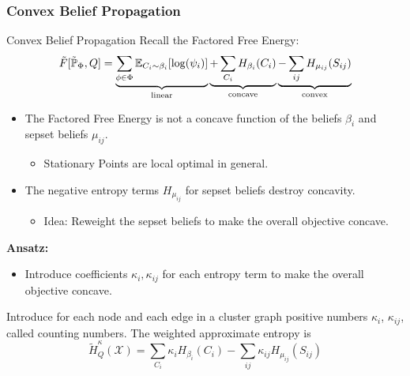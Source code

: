 

\subsubsection{Convex Belief Propagation}

\begin{frame}{Convex Belief Propagation}
Recall the Factored Free Energy:
\begin{equation}
        \tilde{F}[\tilde{\Pb}_{\Phi},Q] = \underbrace{\sum_{\phi \in \Phi} \E_{C_i \sim \beta_i}[\log(\psi_i)]}_{\text{linear}} \underbrace{+ \sum_{C_i} H_{\beta_i}(C_i)}_{\text{concave}} \underbrace{- \sum_{ij} H_{\mu_{ij}}(S_{ij})}_{\text{convex}}
\end{equation}
\begin{itemize}
\pause \item The Factored Free Energy is not a concave function of the beliefs $\beta_i$ and sepset beliefs $\mu_{ij}$.
\begin{itemize}
    \pause \item Stationary Points are local optimal in general.
\end{itemize}
\pause \item The negative entropy terms $H_{\mu_{ij}}$ for sepset beliefs destroy concavity.
\begin{itemize}
    \pause \item Idea: Reweight the sepset beliefs to make the overall objective concave.
\end{itemize}
\end{itemize}
\pause
\textbf{Ansatz:}
\begin{itemize}
    \item Introduce coefficients $\kappa_i, \kappa_{ij}$ for each entropy term to make the overall objective concave.
\end{itemize}
\pause
\begin{definition}
Introduce for each node and each edge in a cluster graph positive numbers $\kappa_i$, $\kappa_{ij}$, called counting numbers.
The weighted approximate entropy is    
\begin{equation}
        \tilde{H}^{\kappa}_Q(\mathcal{X}) =
          \sum_{C_i} \kappa_i H_{\beta_i}(C_i) - \sum_{ij} \kappa_{ij} H_{\mu_{ij}}(S_{ij})
\end{equation}
\end{definition}
\end{frame}

